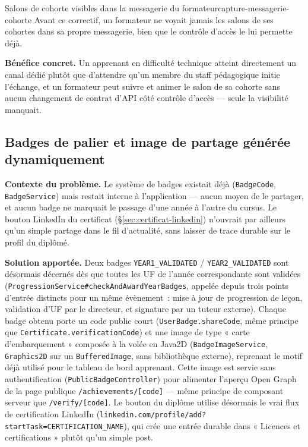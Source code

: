   {Salons de cohorte visibles dans la messagerie du formateur}{capture-messagerie-cohorte}
  {Avant ce correctif, un formateur ne voyait jamais les salons de ses
   cohortes dans sa propre messagerie, bien que le contrôle d'accès le lui
   permette déjà.}

\textbf{Bénéfice concret.} Un apprenant en difficulté technique atteint
directement un canal dédié plutôt que d'attendre qu'un membre du staff
pédagogique initie l'échange, et un formateur peut suivre et animer le
salon de sa cohorte sans aucun changement de contrat d'API côté contrôle
d'accès --- seule la visibilité manquait.

\subsection{Badges de palier et image de partage générée dynamiquement}
\label{sec:badges-linkedin}

\textbf{Contexte du problème.} Le système de badges existait déjà
(\texttt{BadgeCode}, \texttt{BadgeService}) mais restait interne à
l'application --- aucun moyen de le partager, et aucun badge ne marquait le
passage d'une année à l'autre du cursus. Le bouton LinkedIn du certificat
(\S\ref{sec:certificat-linkedin}) n'ouvrait par ailleurs qu'un simple
partage dans le fil d'actualité, sans laisser de trace durable sur le
profil du diplômé.

\textbf{Solution apportée.} Deux badges \texttt{YEAR1\_VALIDATED} /
\texttt{YEAR2\_VALIDATED} sont désormais décernés dès que toutes les UF de
l'année correspondante sont validées
(\texttt{ProgressionService\#checkAndAwardYearBadges}, appelée depuis
trois points d'entrée distincts pour un même évènement~: mise à jour de
progression de leçon, validation d'UF par le directeur, et signature par
un tuteur externe). Chaque badge obtenu porte un code public court
(\texttt{UserBadge.shareCode}, même principe que
\texttt{Certificate.verificationCode}) et une image de type « carte
d'embarquement » composée à la volée en Java2D
(\texttt{BadgeImageService}, \texttt{Graphics2D} sur un
\texttt{BufferedImage}, sans bibliothèque externe), reprenant le motif
déjà utilisé pour le tableau de bord apprenant. Cette image est servie
sans authentification (\texttt{PublicBadgeController}) pour alimenter
l'aperçu Open Graph de la page publique \texttt{/achievements/[code]} ---
même principe de composant serveur que \texttt{/verify/[code]}. Le bouton
du diplôme utilise désormais le vrai flux de certification LinkedIn
(\texttt{linkedin.com/profile/add?startTask=CERTIFICATION\_NAME}), qui
crée une entrée durable dans « Licences et certifications » plutôt qu'un
simple post.

